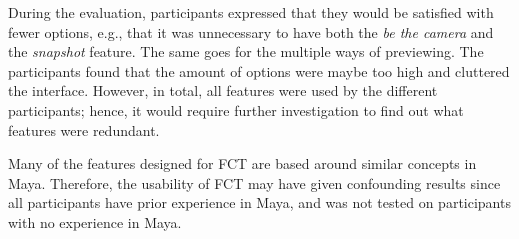 During the evaluation, participants expressed that they would be satisfied with fewer options, e.g., that it was unnecessary to have both the \textit{be the camera} and the \textit{snapshot} feature. The same goes for the multiple ways of previewing. The participants found that the amount of options were maybe too high and cluttered the interface. However, in total, all features were used by the different participants; hence, it would require further investigation to find out what features were redundant.

Many of the features designed for FCT are based around similar concepts in Maya. Therefore, the usability of FCT may have given confounding results since all participants have prior experience in Maya, and was not tested on participants with no experience in Maya.

